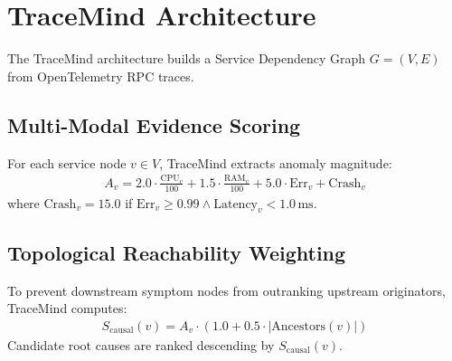 \section{TraceMind Architecture}
\label{sec:methodology}

The TraceMind architecture builds a Service Dependency Graph $G = (V, E)$ from OpenTelemetry RPC traces.

\subsection{Multi-Modal Evidence Scoring}
For each service node $v \in V$, TraceMind extracts anomaly magnitude:
\begin{align}
    A_v = 2.0 \cdot \frac{\text{CPU}_v}{100} + 1.5 \cdot \frac{\text{RAM}_v}{100} + 5.0 \cdot \text{Err}_v + \text{Crash}_v
\end{align}
where $\text{Crash}_v = 15.0$ if $\text{Err}_v \ge 0.99 \land \text{Latency}_v < 1.0\,\text{ms}$.

\subsection{Topological Reachability Weighting}
To prevent downstream symptom nodes from outranking upstream originators, TraceMind computes:
\begin{align}
    S_{\text{causal}}(v) = A_v \cdot \left(1.0 + 0.5 \cdot |\text{Ancestors}(v)|\right)
\end{align}
Candidate root causes are ranked descending by $S_{\text{causal}}(v)$.
